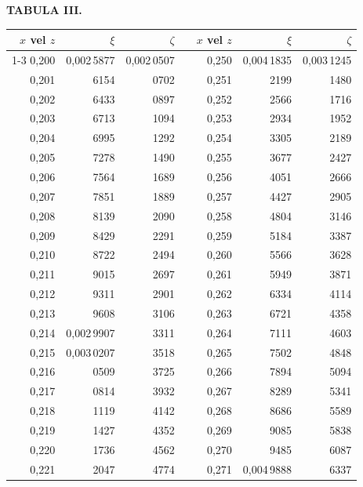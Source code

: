 \endgroup
\clearpage
{}
\begingroup
\centering
\fontsize{9}{9}\selectfont
\setlength{\tabcolsep}{8pt}
\renewcommand{\arraystretch}{1}
\setlength{\parskip}{0pt}
\textbf{TABULA III.}
\par\vspace{7pt}
\begin{tabular}{|r|r|r|@{}p{9pt}@{}|r|r|r|}
\hline
\(x\) vel \(z\) & \(\xi\) & \(\zeta\) & & \(x\) vel \(z\) & \(\xi\) & \(\zeta\) \\
\cline{1-3}\cline{5-7}
0,200 & 0,002\,5877 & 0,002\,0507 &  & 0,250 & 0,004\,1835 & 0,003\,1245 \\
0,201 & 6154 & 0702 &  & 0,251 & 2199 & 1480 \\
0,202 & 6433 & 0897 &  & 0,252 & 2566 & 1716 \\
0,203 & 6713 & 1094 &  & 0,253 & 2934 & 1952 \\
0,204 & 6995 & 1292 &  & 0,254 & 3305 & \llap{\raisebox{1.6ex}{.}\hspace{.1em}}2189 \\
0,205 & 7278 & 1490 &  & 0,255 & 3677 & 2427 \\[3pt]
0,206 & 7564 & 1689 &  & 0,256 & 4051 & 2666 \\
0,207 & 7851 & 1889 &  & 0,257 & 4427 & 2905 \\
0,208 & 8139 & 2090 &  & 0,258 & 4804 & 3146 \\
0,209 & 8429 & 2291 &  & 0,259 & 5184 & 3387 \\
0,210 & 8722 & 2494 &  & 0,260 & 5566 & 3628 \\[3pt]
0,211 & 9015 & 2697 &  & 0,261 & 5949 & 3871 \\
0,212 & 9311 & 2901 &  & 0,262 & 6334 & 4114 \\
0,213 & 9608 & 3106 &  & 0,263 & 6721 & 4358 \\
0,214 & 0,002\,9907 & 3311 &  & 0,264 & 7111 & 4603 \\
0,215 & 0,003\,0207 & 3518 &  & 0,265 & 7502 & 4848 \\[3pt]
0,216 & 0509 & 3725 &  & 0,266 & 7894 & 5094 \\
0,217 & 0814 & 3932 &  & 0,267 & 8289 & 5341 \\
0,218 & 1119 & 4142 &  & 0,268 & 8686 & 5589 \\
0,219 & 1427 & 4352 &  & 0,269 & 9085 & 5838 \\
0,220 & 1736 & 4562 &  & 0,270 & 9485 & 6087 \\[3pt]
0,221 & 2047 & 4774 &  & 0,271 & 0,004\,9888 & 6337 \\

\end{tabular}
